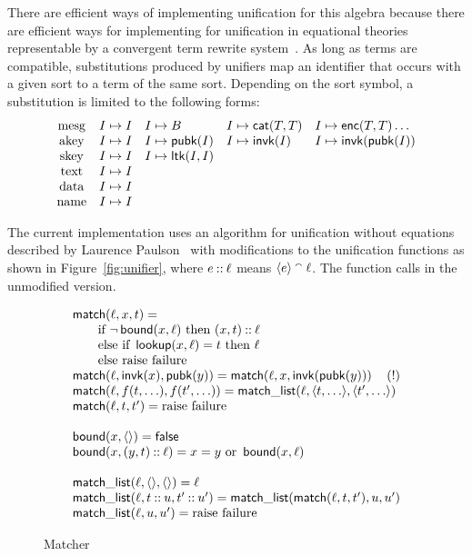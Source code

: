 \documentclass[12pt]{report}
\theoremstyle{definition}
\begin{document}
There are efficient ways of implementing unification for this algebra
because there are efficient ways for implementing for unification in
equational theories representable by a convergent term rewrite
system~\cite{Fay79}. As long as terms are compatible, substitutions
produced by unifiers map an identifier that occurs with a given sort to a
term of the same sort.  Depending on the sort symbol, a substitution is
limited to the following forms:
$$
\begin{array}{cllll}
\operatorname{\mathrm{mesg}}&I\mapsto I&I\mapsto B
&I\mapsto\operatorname{\mathsf{cat}}(T,T)&I\mapsto\operatorname{\mathsf{enc}}(T,T)\ldots\\
\operatorname{\mathrm{akey}}&I\mapsto I&I\mapsto\operatorname{\mathsf{pubk}}(I)
&I\mapsto\operatorname{\mathsf{invk}}(I)&I\mapsto\operatorname{\mathsf{invk}}(\operatorname{\mathsf{pubk}}(I))\\
\operatorname{\mathrm{skey}}&I\mapsto I&I\mapsto\operatorname{\mathsf{ltk}}(I, I)\\
\operatorname{\mathrm{text}}&I\mapsto I\\
\operatorname{\mathrm{data}}&I\mapsto I\\
\operatorname{\mathrm{name}}&I\mapsto I
\end{array}
$$

The current implementation uses an algorithm for unification without
equations described by Laurence Paulson~\cite[Page~381]{Paulson91}
with modifications to the unification functions as shown in
Figure~\ref{fig:unifier}, where $e\mathbin{::}\ell$ means
$\langle e\rangle\mathbin{{}^\smallfrown}\ell$.  The function  calls 
in the unmodified version.

\begin{figure}
$$
\begin{array}{l}
\cn{match}(\ell,x,t) =
\\\qquad\mbox{if }\lnot\cn{bound}(x, \ell)\mbox{ then }(x,t)\cons\ell
\\\qquad\mbox{else if } \cn{lookup}(x,\ell)= t\mbox{ then }\ell
\\\qquad\mbox{else raise failure}
\\\cn{match}(\ell,\cn{invk}(x),\cn{pubk}(y)) =
\cn{match}(\ell, x, \cn{invk}(\cn{pubk}(y)))\hfill(!)
\\\cn{match}(\ell,f(t,\ldots),f(t',\ldots)) =
\cn{match\_list}(\ell,\seq{t,\ldots},\seq{t',\ldots})
\\\cn{match}(\ell,t,t') =\mbox{raise failure}
\\
\\\cn{bound}(x,\seq{})=\cn{false}
\\\cn{bound}(x,(y,t)\cons\ell)=
x=y\mbox{ or }\cn{bound}(x, \ell)
\\
\\\cn{match\_list}(\ell,\seq{},\seq{}) =\ell
\\\cn{match\_list}(\ell,t\cons u,t'\cons u') =
\cn{match\_list}(\cn{match}(\ell,t,t'), u, u')
\\\cn{match\_list}(\ell,u,u') =\mbox{raise failure}
\end{array}
$$
\caption{Matcher}\label{fig:matcher}
\end{figure}




\printindex
\end{document}
